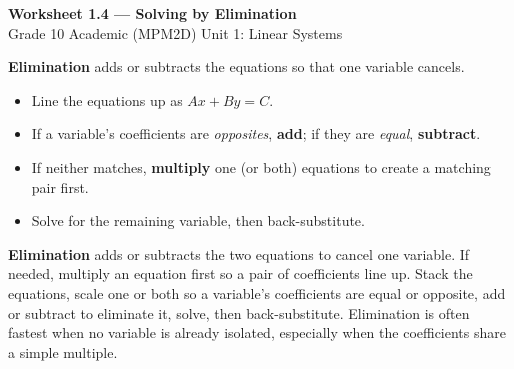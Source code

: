 \documentclass[11pt]{article}
\begin{document}
\begin{center}
{\LARGE\bfseries\color{titleblue}Worksheet 1.4 --- Solving by Elimination}\\[2pt]
{\small Grade 10 Academic (MPM2D) \textperiodcentered{} Unit 1: Linear Systems}
\end{center}

\begin{ideabox}
\textbf{Elimination} adds or subtracts the equations so that one variable cancels.
\begin{itemize}[leftmargin=*,itemsep=2pt]
  \item Line the equations up as $Ax+By=C$.
  \item If a variable's coefficients are \emph{opposites}, \textbf{add}; if they are \emph{equal}, \textbf{subtract}.
  \item If neither matches, \textbf{multiply} one (or both) equations to create a matching pair first.
  \item Solve for the remaining variable, then back-substitute.
\end{itemize}
\end{ideabox}

\begin{learnbox}
\textbf{Elimination} adds or subtracts the two equations to cancel one variable. If needed, multiply an equation first so a pair of coefficients line up.
Stack the equations, scale one or both so a variable's coefficients are equal or opposite, add or subtract to eliminate it, solve, then back-substitute.
Elimination is often fastest when no variable is already isolated, especially when the coefficients share a simple multiple.
\end{learnbox}

\end{document}
